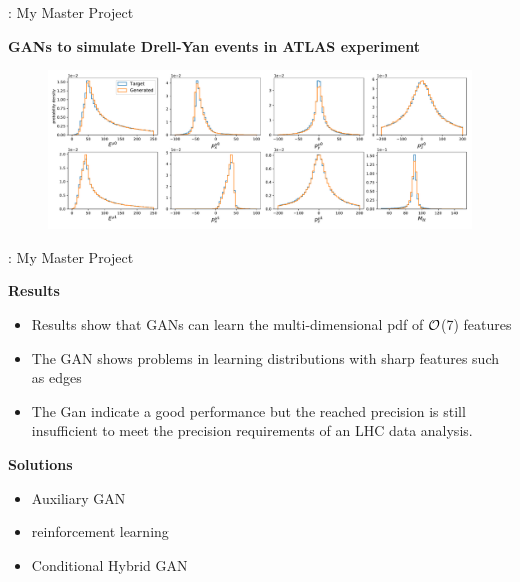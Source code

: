 \documentclass[11pt,aspectratio=169]{beamer}
\begin{document}
\begin{frame}{\underline{\secname} : My Master Project}
	
	
	\begin{center}
		\textbf{GANs to simulate Drell-Yan events in  ATLAS experiment}
	\end{center}	
	
	
\begin{figure}[H]
	\begin{center}
		\includegraphics[width=\textwidth]{slides/trial9_epoch39700_minigantest_mllloss_final}
	\end{center}
\end{figure}
	
	


	
\end{frame}

\begin{frame}{\underline{\secname} : My Master Project}
	
	
	\begin{center}
		\textbf{Results}
	\end{center}	
	
			\begin{itemize}			  \setlength\itemsep{0em}
\item
	Results show that GANs can learn the multi-dimensional pdf of $\cal{O}$(7) features
\item
The GAN shows problems in learning distributions with sharp features such as edges
\item
 The Gan indicate a good performance but the reached precision is still insufficient to meet the precision requirements of an LHC data analysis.
			\end{itemize}

 	\begin{center}
		\textbf{Solutions}
	\end{center}
			\begin{itemize}			  \setlength\itemsep{0em}
\item Auxiliary GAN
\item reinforcement learning

\item  Conditional Hybrid GAN


\end{itemize}
\end{frame}
\end{document}
